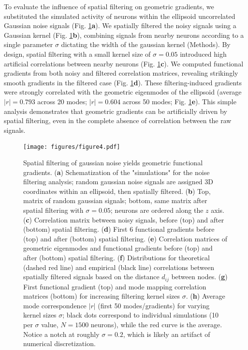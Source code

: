 \documentclass{article}
\begin{document}
To evaluate the influence of spatial filtering on geometric gradients, we substituted the simulated activity of neurons within the ellipsoid uncorrelated Gaussian noise signals (Fig. \ref{fig4}\textbf{a}). We spatially filtered the noisy signals using a Gaussian kernel (Fig. \ref{fig4}\textbf{b}), combining signals from nearby neurons according to a single parameter $\sigma$ dictating the width of the gaussian kernel (Methods). By design, spatial filtering with a small kernel size of $\sigma=0.05$ introduced high artificial correlations between nearby neurons (Fig. \ref{fig4}\textbf{c}). We computed functional gradients from both noisy and filtered correlation matrices, revealing strikingly smooth gradients in the filtered case (Fig. \ref{fig4}\textbf{d}). These filtering-induced gradients were strongly correlated with the geometric eigenmodes of the ellipsoid (average $|r|=0.793$ across 20 modes; $|r|=0.604$ across 50 modes; Fig. \ref{fig4}\textbf{e}). This simple analysis demonstrates that geometric gradients can be artificially driven by spatial filtering, even in the complete absence of correlation between the raw signals.

\begin{figure}[t]
    \centering
    \texttt{[image: figures/figure4.pdf]}
    \caption{Spatial filtering of gaussian noise yields geometric functional gradients. (\textbf{a}) Schematization of the "simulations" for the noise filtering analysis; random gaussian noise signals are assigned 3D coordinates within an ellipsoid, then spatially filtered. (\textbf{b}) Top, matrix of random gaussian signals; bottom, same matrix after spatial filtering with $\sigma=0.05$; neurons are ordered along the $z$ axis. (\textbf{c}) Correlation matrix between noisy signals, before (top) and after (bottom) spatial filtering. (\textbf{d}) First 6 functional gradients before (top) and after (bottom) spatial filtering. (\textbf{e}) Correlation matrices of geometric eigenmodes and functional gradients before (top) and after (bottom) spatial filtering. (\textbf{f}) Distributions for theoretical (dashed red line) and empirical (black line) correlations between spatially filtered signals based on the distance $d_{ij}$ between nodes. (\textbf{g}) First functional gradient (top) and mode mapping correlation matrices (bottom) for increasing filtering kernel sizes $\sigma$. (\textbf{h}) Average mode correspondence $|r|$ (first 50 modes/gradients) for varying kernel sizes $\sigma$; black dots correspond to individual simulations (10 per $\sigma$ value, $N=1500$ neurons), while the red curve is the average. Notice a notch at roughly $\sigma=0.2$, which is likely an artifact of numerical discretization.}
    \label{fig4}
    \hrulefill
\end{figure}
\end{document}
